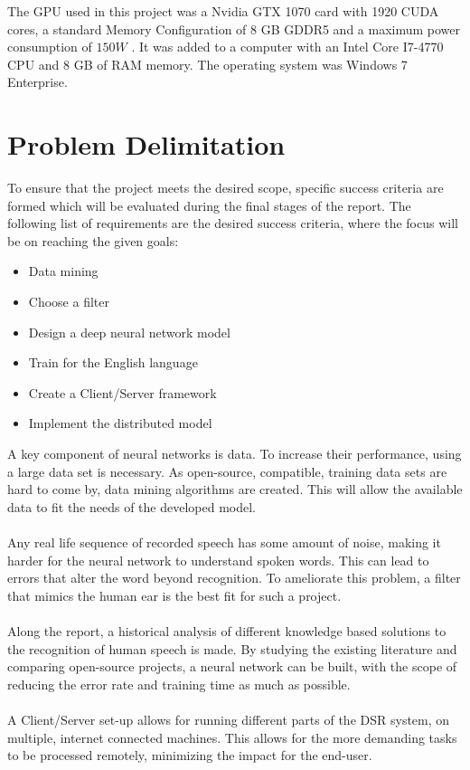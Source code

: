 The GPU used in this project was a Nvidia GTX 1070 card with 1920 CUDA cores, a standard Memory Configuration of 8 GB GDDR5 and a maximum power consumption of $150W$ \cite{GPU}. It was added to a computer with an Intel Core I7-4770 CPU and 8 GB of RAM memory. The operating system was Windows 7 Enterprise.

\section{Problem Delimitation}\label{sec:PD}
To ensure that the project meets the desired scope,
specific success criteria are formed which will be
evaluated during the final stages of the report.
The following list of requirements are the desired
success criteria, where the focus will be on reaching
the given goals:
\begin{itemize}
	\item Data mining
	\item Choose a filter
	\item Design a deep neural network model
	\item Train for the English language
	\item Create a Client/Server framework
	\item Implement the distributed model
\end{itemize}
A key component of neural networks is data. To increase their performance, using a large data set is necessary. As open-source, compatible, training data sets are hard to come by, data mining algorithms are created. This will allow the available data to fit the needs of the developed model.\\\\
Any real life sequence of recorded speech has some amount of noise, making it harder for the neural network to understand spoken words.
This can lead to errors that alter the word beyond recognition. 
To ameliorate this problem, a filter that mimics the human
ear is the best fit for such a project.\\\\
Along the report, a historical analysis of different knowledge
based solutions to the recognition of human speech is made.
By studying the existing literature and comparing open-source projects, a neural network can be built, with the scope of reducing the error rate and training time as much
as possible.\\\\
A Client/Server set-up allows for running different parts of the DSR system, on multiple, internet connected machines. This allows for the more demanding tasks to be processed remotely, minimizing the impact for the end-user.


